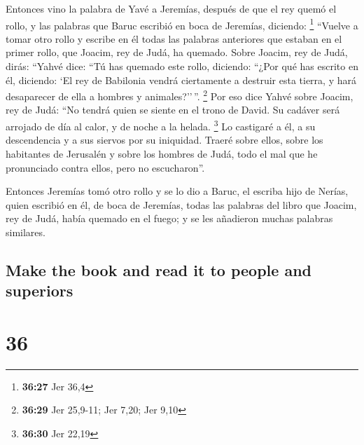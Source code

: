 \begin{paracol}{2}
 Entonces vino la palabra de Yavé a Jeremías, después de
que el rey quemó el rollo, y las palabras que Baruc escribió en boca de
Jeremías, diciendo: \footnote{\textbf{36:27} Jer 36,4} 
``Vuelve a tomar otro rollo y escribe en él todas las palabras
anteriores que estaban en el primer rollo, que Joacim, rey de Judá, ha
quemado.  Sobre Joacim, rey de Judá, dirás: ``Yahvé dice:
``Tú has quemado este rollo, diciendo: ``¿Por qué has escrito en él,
diciendo: `El rey de Babilonia vendrá ciertamente a destruir esta
tierra, y hará desaparecer de ella a hombres y animales?''\,''.
\footnote{\textbf{36:29} Jer 25,9-11; Jer 7,20; Jer 9,10}
 Por eso dice Yahvé sobre Joacim, rey de Judá: ``No
tendrá quien se siente en el trono de David. Su cadáver será arrojado de
día al calor, y de noche a la helada. \footnote{\textbf{36:30} Jer 22,19}
 Lo castigaré a él, a su descendencia y a sus siervos por
su iniquidad. Traeré sobre ellos, sobre los habitantes de Jerusalén y
sobre los hombres de Judá, todo el mal que he pronunciado contra ellos,
pero no escucharon''.

 Entonces Jeremías tomó otro rollo y se lo dio a Baruc,
el escriba hijo de Nerías, quien escribió en él, de boca de Jeremías,
todas las palabras del libro que Joacim, rey de Judá, había quemado en
el fuego; y se les añadieron muchas palabras similares.

\switchcolumn
\begin{otherlanguage}{english}

\hypertarget{make-the-book-and-read-it-to-people-and-superiors}{%
\subsection{Make the book and read it to people and
superiors}\label{make-the-book-and-read-it-to-people-and-superiors}}

\hypertarget{section-71}{%
\section{36}\label{section-71}}


\end{otherlanguage}
\end{paracol}
